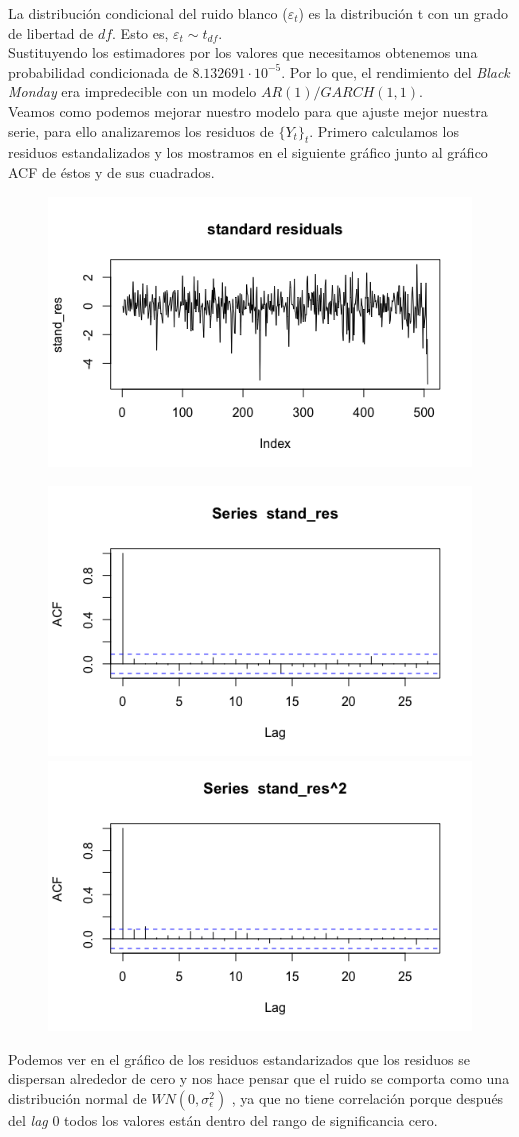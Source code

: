 \documentclass[a4paper,]{article}
\begin{document}
La distribución condicional del ruido blanco ($\varepsilon_{t}$) es la distribución t con un grado de libertad de $df$. Esto es, $\varepsilon_{t} \sim t_{df}.$ \\

Sustituyendo los estimadores por los valores que necesitamos obtenemos una probabilidad condicionada de $8.132691\cdot 10^{-5}$. Por lo que, el rendimiento del \textit{Black Monday} era impredecible con un modelo $AR(1)/GARCH(1,1)$. \\

Veamos como podemos mejorar nuestro modelo para que ajuste mejor nuestra serie, para ello analizaremos los residuos de $\{Y_{t}\}_t$. Primero calculamos los residuos estandalizados y los mostramos en el siguiente gráfico junto al gráfico ACF de éstos y de sus cuadrados.

\begin{figure}[H]
    \centering 
    \includegraphics[width=0.5\linewidth]{stdres.png} 
\end{figure}

\begin{figure}[H]
    \centering
    \includegraphics[width=0.4\linewidth]{stand_res.png}
    \includegraphics[width=0.4\linewidth]{stand_res^2.png}   
\end{figure}

Podemos ver en el gráfico de los residuos estandarizados que los residuos se dispersan alrededor de cero y nos hace pensar que el ruido se comporta como una distribución normal de $WN(0, \sigma_\epsilon^2)$ , ya que no tiene correlación porque después del \textit{lag} 0 todos los valores están dentro del rango de significancia cero. \\
\end{document}
